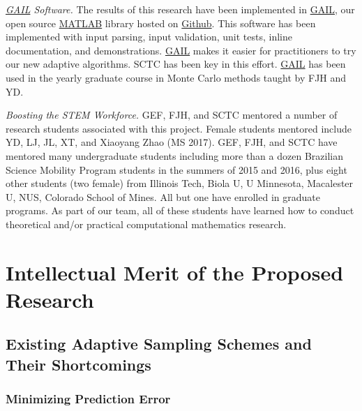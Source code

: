 \documentclass[11pt]{NSFamsart}
\newcommand{\GAIL}{\hyperlink{GAILlink}{GAIL}\xspace}
\newcommand{\MATLAB}{\hyperlink{MATLABlink}{MATLAB}\xspace}
\newcommand{\Rlang}{\hyperlink{Rlink}{R}\xspace}
\begin{document}
\emph{\GAIL Software.} The results of this research have been implemented in 
\GAIL, our open source \MATLAB library hosted on
\href{http://gailgithub.github.io/GAIL_Dev/} {Github}. This software 
has been implemented with input parsing, input validation, unit tests, inline documentation, and 
demonstrations.  \GAIL makes it easier for practitioners to try our new adaptive algorithms.  SCTC has been key in this effort.  \GAIL has been used in the yearly graduate course in Monte Carlo methods taught by FJH and YD.  

\emph{Boosting the STEM Workforce.} GEF, FJH, and SCTC mentored a number of 
research students associated with this project.  Female students mentored include YD, LJ, JL, XT, and Xiaoyang Zhao (MS 2017).   GEF, FJH,  and SCTC have mentored many undergraduate students including more than a dozen 
Brazilian Science Mobility Program students in the summers of 2015 and 2016, plus eight other students (two female) from Illinois Tech, Biola U, U Minnesota, Macalester U, NUS, Colorado School of Mines.  All but one have enrolled in graduate programs.   As part of our team, all of
these students have learned how to conduct theoretical and/or practical computational mathematics research.

\section{Intellectual Merit of the Proposed Research} \label{sec:Proposed}

\subsection{Existing Adaptive Sampling Schemes and Their Shortcomings} \label{sec:shortExist}




\subsubsection{Minimizing Prediction Error} \label{sec:MinPredErr}
\end{document}
